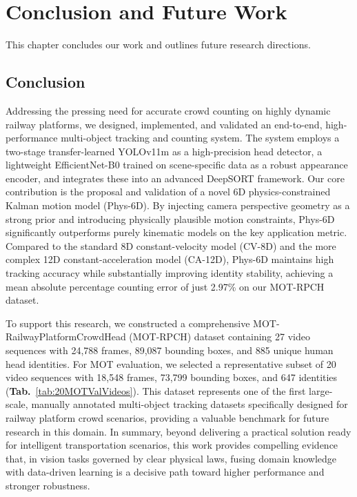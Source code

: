 \clearpage
\section{Conclusion and Future Work}\label{section::Conclusion and Future Work}

This chapter concludes our work and outlines future research directions.

\subsection{Conclusion}
Addressing the pressing need for accurate crowd counting on highly dynamic railway platforms, we designed, implemented, and validated an end-to-end, high-performance multi-object tracking and counting system. The system employs a two-stage transfer-learned YOLOv11m as a high-precision head detector, a lightweight EfficientNet-B0 trained on scene-specific data as a robust appearance encoder, and integrates these into an advanced DeepSORT framework.
Our core contribution is the proposal and validation of a novel 6D physics-constrained Kalman motion model (Phys-6D). By injecting camera perspective geometry as a strong prior and introducing physically plausible motion constraints, Phys-6D significantly outperforms purely kinematic models on the key application metric. Compared to the standard 8D constant-velocity model (CV-8D) and the more complex 12D constant-acceleration model (CA-12D), Phys-6D maintains high tracking accuracy while substantially improving identity stability, achieving a mean absolute percentage counting error of just 2.97\% on our MOT-RPCH dataset.

To support this research, we constructed a comprehensive MOT-RailwayPlatformCrowdHead (MOT-RPCH) dataset containing 27 video sequences with 24,788 frames, 89,087 bounding boxes, and 885 unique human head identities. For MOT evaluation, we selected a representative subset of 20 video sequences with 18,548 frames, 73,799 bounding boxes, and 647 identities (\textbf{Tab.}~\ref{tab:20MOTValVideos}). This dataset represents one of the first large-scale, manually annotated multi-object tracking datasets specifically designed for railway platform crowd scenarios, providing a valuable benchmark for future research in this domain.
In summary, beyond delivering a practical solution ready for intelligent transportation scenarios, this work provides compelling evidence that, in vision tasks governed by clear physical laws, fusing domain knowledge with data-driven learning is a decisive path toward higher performance and stronger robustness.

